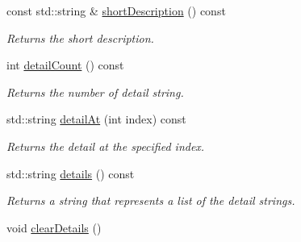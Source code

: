 \begin{DoxyCompactItemize}
\item 
const std\-::string \& \hyperlink{class_message_aa22497c35079e8619c516f693d1fd97f}{short\-Description} () const 
\begin{DoxyCompactList}\small\item\em Returns the short description. \end{DoxyCompactList}\item 
int \hyperlink{class_message_a312fc09ce16cb1414a0efd2458defc21}{detail\-Count} () const 
\begin{DoxyCompactList}\small\item\em Returns the number of detail string. \end{DoxyCompactList}\item 
std\-::string \hyperlink{class_message_ad2fea61f003bfbe810ce8149f2faf6a2}{detail\-At} (int index) const 
\begin{DoxyCompactList}\small\item\em Returns the detail at the specified index. \end{DoxyCompactList}\item 
std\-::string \hyperlink{class_message_aacec5052940b4e18a35bb3f363f05cc4}{details} () const 
\begin{DoxyCompactList}\small\item\em Returns a string that represents a list of the detail strings. \end{DoxyCompactList}\item 
\hypertarget{class_message_af5a1d2f3def9208bb603587f79c5d711}{void \hyperlink{class_message_af5a1d2f3def9208bb603587f79c5d711}{clear\-Details} ()}\label{class_message_af5a1d2f3def9208bb603587f79c5d711}


\end{DoxyCompactItemize}

